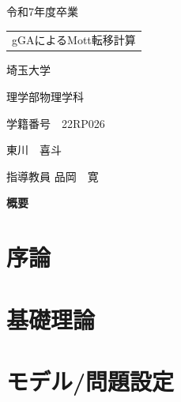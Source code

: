 \documentclass[a4paper,12pt,titlepage,openany]{bxjsbook}
\numberwithin{equation}{section}
\newcommand{\ThesisYear}{令和7年度卒業}
\newcommand{\ThesisTitleLineA}{gGAによるMott転移計算}
\newcommand{\ThesisTitleLineB}{}
\newcommand{\GraduateSchool}{埼玉大学}
\newcommand{\Department}{理学部物理学科}
\newcommand{\StudentID}{22RP026}
\newcommand{\AuthorName}{東川　喜斗}
\newcommand{\Supervisor}{指導教員 品岡　寛}
\begin{document}
\thispagestyle{empty}
\vspace{7cm}
\begin{center}
{\Large \ThesisYear}

\vspace{5cm}

{\LARGE
\begin{tabular}{c}
\ThesisTitleLineA \\
\ThesisTitleLineB
\end{tabular}}

\vspace{5cm}

{\Large \GraduateSchool}

\vspace{0.1cm}
{\Large \Department}

\vspace{0.1cm}
{\Large 学籍番号　\StudentID}

\vspace{1cm}
{\LARGE \AuthorName}
\vspace{1cm}

{\Large \Supervisor}
\end{center}

\clearpage

\thispagestyle{empty}
\begin{center}
{\large \textbf{概要}}
\end{center}
\vspace{0.5cm}


\clearpage

\setcounter{tocdepth}{2}
{
\hypersetup{linkcolor=black}
\tableofcontents
}

\clearpage

\chapter{序論}


\chapter{基礎理論}


\chapter{モデル/問題設定}

\end{document}
